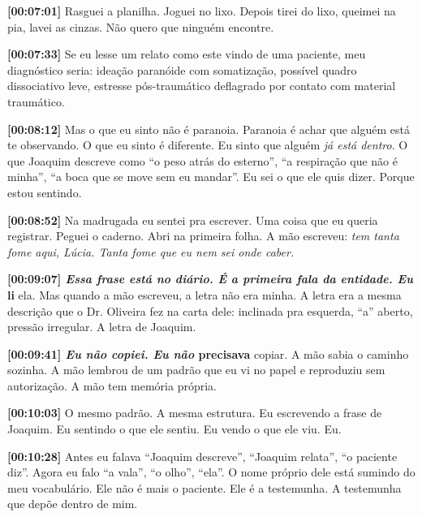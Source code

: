\noindent \textbf{[00:07:01]} Rasguei a planilha. Joguei no lixo. Depois tirei do lixo, queimei na pia, lavei as cinzas. Não quero que ninguém encontre.

\noindent \textbf{[00:07:33]} Se eu lesse um relato como este vindo de uma paciente, meu diagnóstico seria: ideação paranóide com somatização, possível quadro dissociativo leve, estresse pós-traumático deflagrado por contato com material traumático.

\noindent \textbf{[00:08:12]} Mas o que eu sinto não é paranoia. Paranoia é achar que alguém está te observando. O que eu sinto é diferente. Eu sinto que alguém \textit{já está dentro}. O que Joaquim descreve como \textquotedblleft{}o peso atrás do esterno\textquotedblright{}, \textquotedblleft{}a respiração que não é minha\textquotedblright{}, \textquotedblleft{}a boca que se move sem eu mandar\textquotedblright{}. Eu sei o que ele quis dizer. Porque estou sentindo.

\noindent \textbf{[00:08:52]} Na madrugada eu sentei pra escrever. Uma coisa que eu queria registrar. Peguei o caderno. Abri na primeira folha. A mão escreveu: \textit{tem tanta fome aqui, Lúcia. Tanta fome que eu nem sei onde caber.}

\noindent \textbf{[00:09:07]\textit{ Essa frase está no diário. É a primeira fala da entidade. Eu }li} ela. Mas quando a mão escreveu, a letra não era minha. A letra era a mesma descrição que o Dr. Oliveira fez na carta dele: inclinada pra esquerda, \textquotedblleft{}a\textquotedblright{} aberto, pressão irregular. A letra de Joaquim.

\noindent \textbf{[00:09:41]\textit{ Eu não copiei. Eu não }precisava} copiar. A mão sabia o caminho sozinha. A mão lembrou de um padrão que eu vi no papel e reproduziu sem autorização. A mão tem memória própria.

\noindent \textbf{[00:10:03]} O mesmo padrão. A mesma estrutura. Eu escrevendo a frase de Joaquim. Eu sentindo o que ele sentiu. Eu vendo o que ele viu. Eu.

\noindent \textbf{[00:10:28]} Antes eu falava \textquotedblleft{}Joaquim descreve\textquotedblright{}, \textquotedblleft{}Joaquim relata\textquotedblright{}, \textquotedblleft{}o paciente diz\textquotedblright{}. Agora eu falo \textquotedblleft{}a vala\textquotedblright{}, \textquotedblleft{}o olho\textquotedblright{}, \textquotedblleft{}ela\textquotedblright{}. O nome próprio dele está sumindo do meu vocabulário. Ele não é mais o paciente. Ele é a testemunha. A testemunha que depõe dentro de mim.

